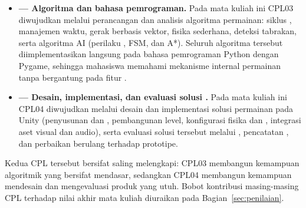 \begin{itemize}
  \item \textbf{ --- Algoritma dan bahasa pemrograman.}
        Pada mata kuliah ini CPL03 diwujudkan melalui perancangan dan analisis
        algoritma permainan: siklus , manajemen waktu,
        gerak berbasis vektor, fisika sederhana, deteksi tabrakan, serta
        algoritma AI (perilaku , FSM, dan A*). Seluruh algoritma
        tersebut diimplementasikan langsung pada bahasa pemrograman Python
        dengan  Pygame, sehingga mahasiswa memahami mekanisme
        internal permainan tanpa bergantung pada fitur 
        .

  \item \textbf{ --- Desain, implementasi, dan evaluasi solusi
        .}
        Pada mata kuliah ini CPL04 diwujudkan melalui desain dan implementasi
        solusi permainan pada  Unity (penyusunan
         dan , pembangunan level, konfigurasi
        fisika dan , integrasi aset visual dan audio), serta
        evaluasi solusi tersebut melalui , pencatatan
        , dan perbaikan berulang terhadap prototipe.
\end{itemize}

Kedua CPL tersebut bersifat saling melengkapi: CPL03 membangun kemampuan
algoritmik yang bersifat mendasar, sedangkan CPL04 membangun kemampuan
mendesain dan mengevaluasi produk  yang utuh. Bobot
kontribusi masing-masing CPL terhadap nilai akhir mata kuliah diuraikan pada
Bagian~\ref{sec:penilaian}.
